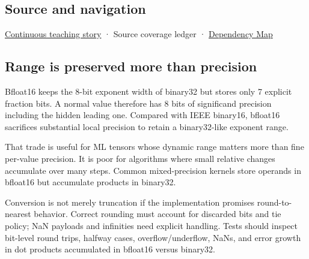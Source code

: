 \subsection{Source and navigation}\label{appendix-18b8dd966b5d-source-and-navigation}

\hyperref[01-foundations-i-ch001-choosing-what-information-to-keep]{Continuous teaching story} · {Source coverage ledger} · \hyperref[appendix-4ad47bdd269a]{Dependency Map}

\subsection{Range is preserved more than precision}\label{appendix-18b8dd966b5d-range-is-preserved-more-than-precision}

Bfloat16 keeps the 8-bit exponent width of binary32 but stores only 7 explicit fraction bits. A normal value therefore has 8 bits of significand precision including the hidden leading one. Compared with IEEE binary16, bfloat16 sacrifices substantial local precision to retain a binary32-like exponent range.

That trade is useful for ML tensors whose dynamic range matters more than fine per-value precision. It is poor for algorithms where small relative changes accumulate over many steps. Common mixed-precision kernels store operands in bfloat16 but accumulate products in binary32.

Conversion is not merely truncation if the implementation promises round-to-nearest behavior. Correct rounding must account for discarded bits and tie policy; NaN payloads and infinities need explicit handling. Tests should inspect bit-level round trips, halfway cases, overflow/underflow, NaNs, and error growth in dot products accumulated in bfloat16 versus binary32.
